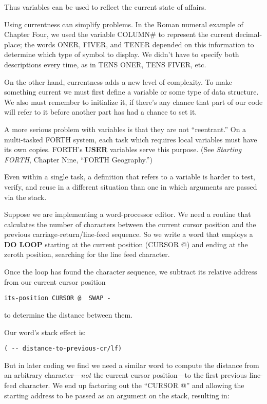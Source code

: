 Thus variables can be used to reflect the current state of affairs.

Using currentness can simplify problems. In the Roman numeral example
of Chapter Four, we used the variable COLUMN\# to represent the
current decimal-place; the words ONER, FIVER, and TENER depended
on this information to determine which type of symbol to display. We
didn't have to specify both descriptions every time, as in TENS ONER,
TENS FIVER, etc.

On the other hand, currentness adds a new level of complexity. To
make something current we must first define a variable or some type of
data structure. We also must remember to initialize it, if there's any
chance that part of our code will refer to it before another part has had a
chance to set it.

A more serious problem with variables is that they are not ``reentrant.''
On a multi-tasked FORTH system, each task which requires
local variables must have its own copies. FORTH's \textbf{USER} variables
serve this purpose. (See \emph{Starting FORTH}, Chapter Nine, ``FORTH
Geography.'')

Even within a single task, a definition that refers to a variable is
harder to test, verify, and reuse in a different situation than one in which
arguments are passed via the stack.

Suppose we are implementing a word-processor editor. We need a
routine that calculates the number of characters between the current cursor
position and the previous carriage-return/line-feed sequence. So we
write a word that employs a \textbf{DO LOOP} starting at the current position
(CURSOR @) and ending at the zeroth position, searching for the line
feed character.

Once the loop has found the character sequence, we subtract its
relative address from our current cursor position

\begin{verbatim}
its-position CURSOR @  SWAP -
\end{verbatim}

to determine the distance between them.

Our word's stack effect is:

\begin{verbatim}
( -- distance-to-previous-cr/lf)
\end{verbatim}

But in later coding we find we need a similar word to compute the
distance from an arbitrary character---\emph{not} the current cursor
position---to the first previous line-feed character. We end up factoring
out the ``CURSOR @'' and allowing the starting address to be passed as an
argument on the stack, resulting in:

